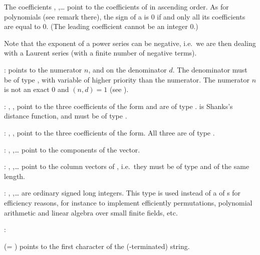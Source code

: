 The coefficients , ,\dots {} point to
the coefficients of  in ascending order. As for polynomials
(see remark there), the sign of a  is $0$ if and only all
its coefficients are equal to $0$. (The leading coefficient cannot be an
integer $0$.)

Note that the exponent of a power series can be negative, i.e.~we are
then dealing with a Laurent series (with a finite number of negative
terms).

:%
  points to the
numerator $n$,
and  on the denominator $d$. The denominator must be of type ,
with variable of higher priority than the numerator. The numerator
$n$ is not an exact $0$ and $(n,d) = 1$ (see ).

:%
 ,
,  point to the three coefficients of the form and are of
type .  is Shanks's distance function, and must be of type
.

:%
 , ,
 point to the three coefficients of the form. All three are of type
.

:%
, ,\dots {} point to the components of the
vector.

: ,
,\dots {} point to the column vectors of ,
i.e.~they must be of type  and of the same length.

:
, ,\dots {} are ordinary signed long
integers. This type is used instead of a  of s for
efficiency reasons, for instance to implement efficiently permutations,
polynomial arithmetic and linear algebra over small finite fields, etc.

:%

 (= ) points to the first character of the
(-terminated) string.

